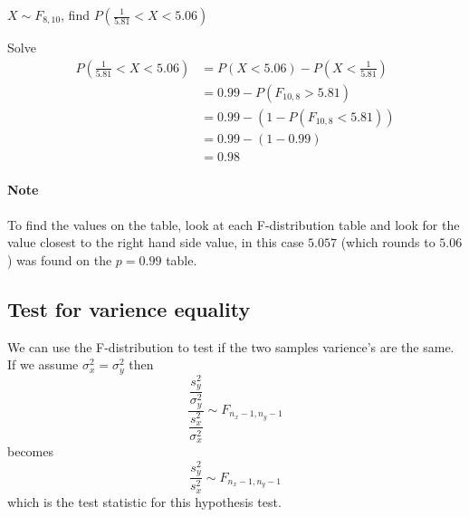         \begin{example}
        {
            $X \sim F_{8, 10}$, find $P(\frac{1}{5.81} < X < 5.06)$
        }

        \begin{step}{Solve}
        \begin{align*} 
        P(\frac{1}{5.81} < X < 5.06) &= P(X < 5.06) - P(X < \frac{1}{5.81})\\ 
        &= 0.99 - P(F_{10, 8} > 5.81)\\ 
        &= 0.99 - (1 - P(F_{10, 8} < 5.81))\\ 
        &= 0.99 - (1 - 0.99)\\ 
        &= 0.98 
        \end{align*}         
        \end{step}

        \end{example}
        \paragraph{Note}
        To find the values on the table, look at each F-distribution table and look for the value closest to the right hand side value, in this case $5.057$ (which rounds to $5.06$) was found on the $p = 0.99$ table.


    \subsection{Test for varience equality}
        We can use the F-distribution to test if the two samples varience's are the same. If we assume $\sigma^2_x = \sigma^2_y$ then 
        $$\dfrac{\dfrac{s_y^2}{\sigma_y^2}}{\dfrac{s_x^2}{\sigma_x^2}} \sim F_{n_x-1, n_y-1} $$ 
        becomes 
        $$\dfrac{s_y^2}{s_x^2} \sim F_{n_x-1, n_y-1}$$ 
        which is the test statistic for this hypothesis test.

